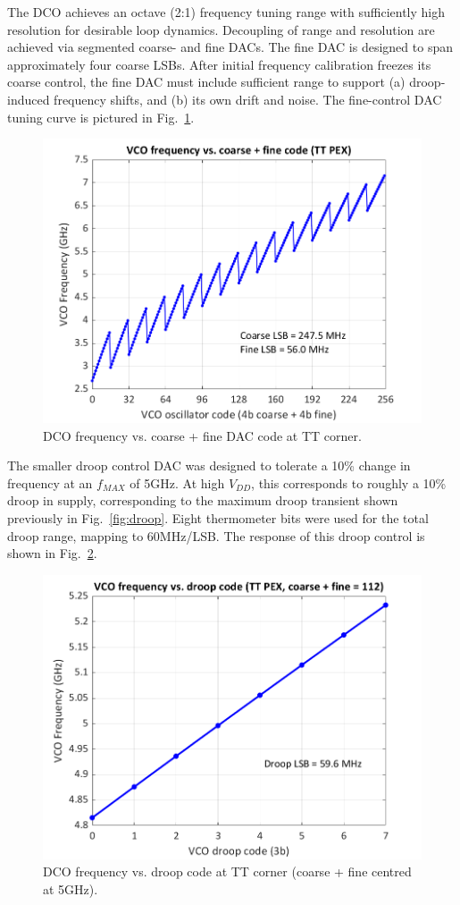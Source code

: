 \documentclass[twoside,9pt,journal,letterpage]{IEEEtran}
\begin{document}
The DCO achieves an octave (2:1) frequency tuning range with sufficiently high resolution for desirable loop dynamics. Decoupling of range and resolution are achieved via segmented coarse- and fine DACs. The fine DAC is designed to span approximately four coarse LSBs. After initial frequency calibration freezes its coarse control, the fine DAC must include sufficient range to support (a) droop-induced frequency shifts, and (b) its own drift and noise. The fine-control DAC tuning curve is pictured in Fig.\ \ref{fig:dco_oscctrl}.

\begin{figure}[h]
	\centering
	\includegraphics[width=0.75\columnwidth]{fig_dco_oscctrl}
	\caption{DCO frequency vs. coarse + fine DAC code at TT corner.}
	\label{fig:dco_oscctrl}
\end{figure}

The smaller droop control DAC was designed to tolerate a 10\% change in frequency at an $f_{MAX}$ of 5GHz. At high $V_{DD}$, this corresponds to roughly a 10\% droop in supply, corresponding to the maximum droop transient shown previously in Fig.\ \ref{fig:droop}. Eight thermometer bits were used for the total droop range, mapping to 60MHz/LSB. The response of this droop control is shown in Fig.\ \ref{fig:dco_droopctrl}.

\begin{figure}[h]
	\centering
	\includegraphics[width=0.75\columnwidth]{fig_dco_droopctrl}
	\caption{DCO frequency vs. droop code at TT corner (coarse + fine centred at 5GHz).}
	\label{fig:dco_droopctrl}
\end{figure}
\end{document}
